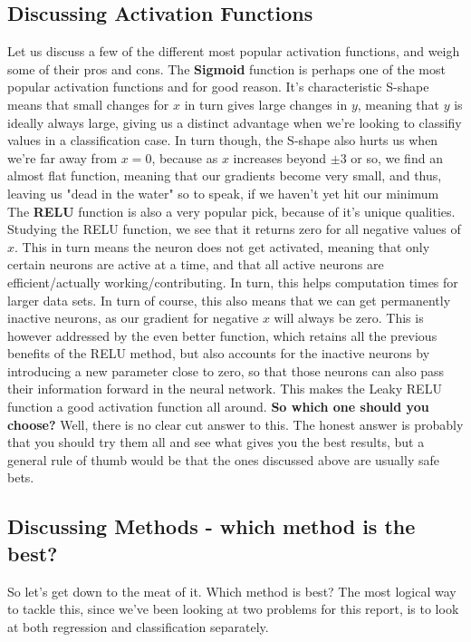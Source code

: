 \documentclass{article}
\begin{document}
\subsection*{Discussing Activation Functions}
Let us discuss a few of the different most popular activation functions, and weigh some of their pros and cons.
\newline The \textbf{Sigmoid} function is perhaps one of the most popular activation functions and for good reason. It's characteristic S-shape means that small changes for $x$ in turn gives large changes in $y$, meaning that $y$ is ideally always large, giving us a distinct advantage when we're looking to classifiy values in a classification case.
\newline In turn though, the S-shape also hurts us when we're far away from $x=0$, because as $x$ increases beyond $\pm 3$ or so, we find an almost flat function, meaning that our gradients become very small, and thus, leaving us "dead in the water" so to speak, if we haven't yet hit our minimum
\newline The \textbf{RELU} function is also a very popular pick, because of it's unique qualities. Studying the RELU function, we see that it returns zero for all negative values of $x$. This in turn means the neuron does not get activated, meaning that only certain neurons are active at a time, and that all active neurons are efficient/actually working/contributing. In turn, this helps computation times for larger data sets. \newline
In turn of course, this also means that we can get permanently inactive neurons, as our gradient for negative $x$ will always be zero.
\newline This is however addressed by the even better  function, which retains all the previous benefits of the RELU method, but also accounts for the inactive neurons by introducing a new parameter close to zero, so that those neurons can also pass their information forward in the neural network. This makes the Leaky RELU function a good activation function all around.
\newline \textbf{So which one should you choose?} Well, there is no clear cut answer to this. The honest answer is probably that you should try them all and see what gives you the best results, but a general rule of thumb would be that the ones discussed above are usually safe bets.
\subsection*{Discussing Methods - which method is the best?}
So let's get down to the meat of it. Which method is best? The most logical way to tackle this, since we've been looking at two problems for this report, is to look at both regression and classification separately.
\end{document}
